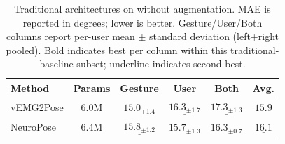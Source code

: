 \begin{table}[h]
\centering
\caption{Traditional architectures on \dataset{} without augmentation. MAE is reported in degrees; lower is better. Gesture/User/Both columns report per-user mean $\pm$ standard deviation (left+right pooled). Bold indicates best per column within this traditional-baseline subset; underline indicates second best.}
\label{tab:egoemg_traditional_wo_aug}
\footnotesize
\setlength{\tabcolsep}{3.5pt}
\renewcommand{\arraystretch}{1.05}
\begin{tabular}{lccccc}
\toprule
Method & Params & Gesture & User & Both & Avg. \\
\midrule
vEMG2Pose & 6.0M & $\mathbf{15.0_{\pm1.4}}$ & $\underline{16.3_{\pm1.7}}$ & $\underline{17.3_{\pm1.3}}$ & $\mathbf{15.9}$ \\
NeuroPose & 6.4M & $\underline{15.8_{\pm1.2}}$ & $\mathbf{15.7_{\pm1.3}}$ & $\mathbf{16.3_{\pm0.7}}$ & $\underline{16.1}$ \\
\bottomrule
\end{tabular}
\end{table}